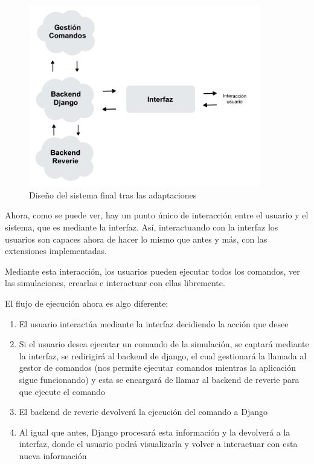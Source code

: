 \begin{figure}[h]
	\centering
	\includegraphics[width = 0.9\textwidth]{Imagenes/Vectorial/disenoSistemaFinal.jpeg}
	\caption{Diseño del sistema final tras las adaptaciones}
	\label{fig:sistemaFinal}
\end{figure}

Ahora, como se puede ver, hay un punto único de interacción entre el usuario y el sistema, que es mediante la interfaz. Así, interactuando con la interfaz los usuarios son capaces ahora de hacer lo mismo que antes y más, con las extensiones implementadas.

Mediante esta interacción, los usuarios pueden ejecutar todos los comandos, ver las simulaciones, crearlas e interactuar con ellas libremente.

El flujo de ejecución ahora es algo diferente:

\begin{enumerate}
	\item El usuario interactúa mediante la interfaz decidiendo la acción que desee
	
	\item Si el usuario desea ejecutar un comando de la simulación, se captará mediante la interfaz, se redirigirá al backend de django, el cual gestionará la llamada al gestor de comandos (nos permite ejecutar comandos mientras la aplicación sigue funcionando) y esta se encargará de llamar al backend de reverie para que ejecute el comando
	
	\item El backend de reverie devolverá la ejecución del comando a Django
	
	\item Al igual que antes, Django procesará esta información y la devolverá a la interfaz, donde el usuario podrá visualizarla y volver a interactuar con esta nueva información
	
\end{enumerate}
